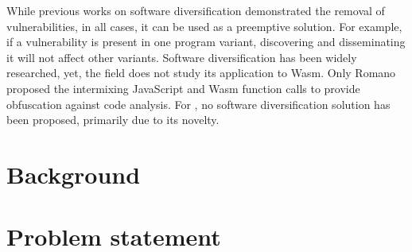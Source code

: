 {While previous works on software diversification demonstrated the removal of vulnerabilities, in all cases, it can be used as a preemptive solution.
For example, if a vulnerability is present in one program variant, discovering and disseminating it will not affect other variants.
Software diversification has been widely researched, yet, the field does not study its application to Wasm.
Only Romano \etal \cite{wobfuscator} proposed the intermixing JavaScript and Wasm function calls to provide obfuscation against code analysis. 
For \wasm, no software diversification solution has been proposed, primarily due to its novelty.


}











\section{Background}





\section{Problem statement}

